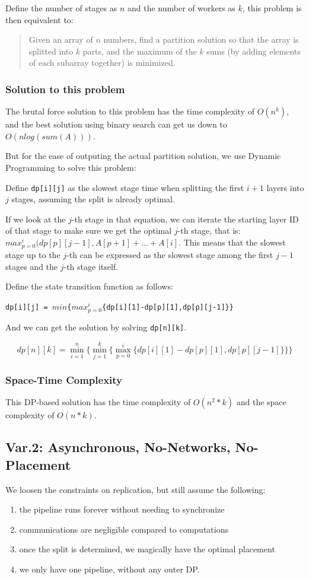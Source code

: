\documentclass[12pt,letterpaper]{article}
\begin{document}
Define the number of stages as $n$ and the number of workers as $k$, this problem is then equivalent to:

\begin{quote}
	Given an array of $n$ numbers, find a partition solution so that the array is splitted into $k$ parts, and the maximum of the $k$ sums (by adding elements of each subarray together) is minimized.
\end{quote}

\subsubsection{Solution to this problem}
The brutal force solution to this problem has the time complexity of $O(n^k)$, and the best solution using binary search can get us down to $O(n log(sum(A)))$.

But for the ease of outputing the actual partition solution, we use Dynamic Programming to solve this problem:

Define \texttt{dp[i][j]} as the slowest stage time when splitting the first $i+1$ layers into $j$ stages, assuming the split is already optimal.

If we look at the $j$-th stage in that equation, we can iterate the starting layer ID of that stage to make sure we get the optimal $j$-th stage, that is: $max_{p=0}^{i}(dp[p][j-1], A[p+1] + ... + A[i]$. This means that the slowest stage up to the $j$-th can be expressed as the slowest stage among the first $j-1$ stages and the $j$-th stage itself. 

Define the state transition function as follows:

\texttt{dp[i][j] = $min$\{$max_{p=0}^{i}$\{dp[i][1]-dp[p][1],dp[p][j-1]\}\}}

And we can get the solution by solving \texttt{dp[n][k]}.

$$dp[n][k] = \min_{i=1}^n\{\min_{j=1}^k\{\max_{p=0}^i\{dp[i][1]-dp[p][1],dp[p][j-1]\}\}\}$$

\subsubsection{Space-Time Complexity}
This DP-based solution has the time complexity of $O(n^2*k)$ and the space complexity of $O(n*k)$.
 
\subsection{Var.2: Asynchronous, No-Networks, No-Placement}
We loosen the constraints on replication, but still assume the following:
\begin{enumerate}
	\item the pipeline runs forever without needing to synchronize
	\item communications are negligible compared to computations
	\item once the split is determined, we magically have the optimal placement
	\item we only have one pipeline, without any outer DP.
\end{enumerate}
\end{document}
